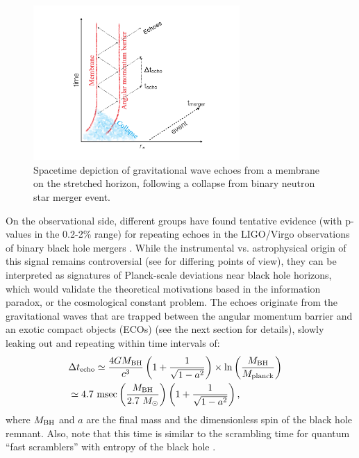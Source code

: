 \documentclass[12pt]{article}
\begin{document}
\begin{figure}[b]
\centering
\includegraphics[width=0.7\textwidth]{echo_pic.pdf}
\caption{Spacetime depiction of gravitational wave echoes from a membrane on the stretched horizon, following a collapse from binary neutron star merger event. }
\label{echo_pic_1}
\end{figure}

On the observational side, different groups have found tentative evidence (with p-values in the 0.2-2\% range) for repeating echoes in the LIGO/Virgo observations of binary black hole mergers \cite{Abedi:2016hgu,Conklin:2017lwb,Westerweck:2017hus}. While the instrumental vs. astrophysical origin of this signal remains controversial (see \cite{Ashton:2016xff, Westerweck:2017hus, Abedi:2017isz, Abedi:2018pst} for differing points of view), they can be interpreted as signatures of Planck-scale deviations near black hole horizons, which would validate the theoretical motivations based in the information paradox, or the cosmological constant problem. The echoes originate from the gravitational waves that are trapped between the angular momentum barrier and an exotic compact objects (ECOs) \cite{Cardoso:2016rao,Cardoso:2016oxy, Wang:2018gin} (see the next section for details), slowly leaking out and repeating within time intervals of:
\begin{eqnarray}
&\Delta t_{\rm echo} \simeq \frac{4 G M_{\rm BH}}{c^3}\left(1+\frac{1}{\sqrt{1-a^2}}\right) \times \ln\left(M_{\rm BH} \over M_{\rm planck}\right)& \nonumber\\ &\simeq 4.7~ {\rm msec} \left(M_{\rm BH} \over 2.7~ M_\odot \right) \left(1+\frac{1}{\sqrt{1-a^2}}\right),& \label{delay}
\end{eqnarray}
where $M_{\rm BH}$ and $a$ are the final mass and the dimensionless spin of the black hole remnant. Also, note that this time is similar to the scrambling time for quantum ``fast scramblers''  with entropy of the black hole  \cite{Hayden:2007cs, Sekino:2008he}. 
\end{document}
